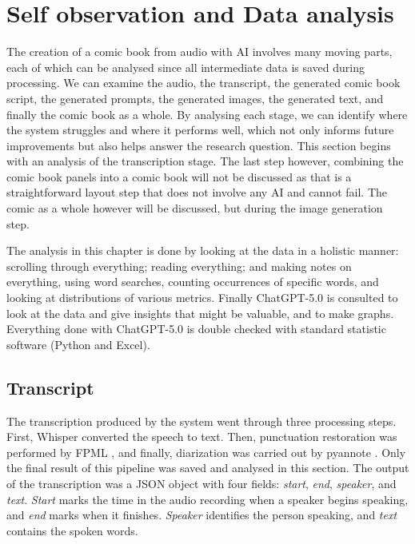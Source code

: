 \section{Self observation and Data analysis}
The creation of a comic book from audio with AI involves many moving parts, each of which can be analysed since all intermediate data is saved during processing. We can examine the audio, the transcript, the generated comic book script, the generated prompts, the generated images, the generated text, and finally the comic book as a whole. By analysing each stage, we can identify where the system struggles and where it performs well, which not only informs future improvements but also helps answer the research question. This section begins with an analysis of the transcription stage. The last step however, combining the comic book panels into a comic book will not be discussed as that is a straightforward layout step that does not involve any AI and cannot fail. The comic as a whole however will be discussed, but during the image generation step.

The analysis in this chapter is done by looking at the data in a holistic manner: scrolling through everything; reading everything; and making notes on everything, using word searches, counting occurrences of specific words, and looking at distributions of various metrics. Finally ChatGPT-5.0 is consulted to look at the data and give insights that might be valuable, and to make graphs. Everything done with ChatGPT-5.0 is double checked with standard statistic software (Python and Excel).

\subsection*{Transcript}
The transcription produced by the system went through three processing steps. First, Whisper converted the speech to text. Then, punctuation restoration was performed by FPML \cite{guhrEtAl}, and finally, diarization was carried out by pyannote \cite{Bredin23,Plaquet23}. Only the final result of this pipeline was saved and analysed in this section. The output of the transcription was a JSON object with four fields: \textit{start}, \textit{end}, \textit{speaker}, and \textit{text}. \textit{Start} marks the time in the audio recording when a speaker begins speaking, and \textit{end} marks when it finishes. \textit{Speaker} identifies the person speaking, and \textit{text} contains the spoken words.

